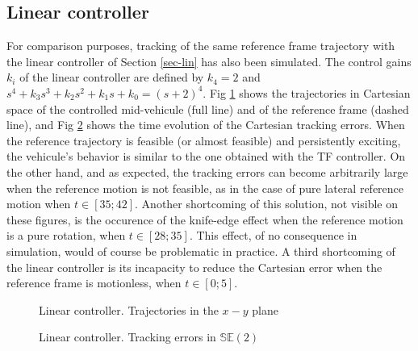 \documentclass[a4paper,twoside]{article}
\def \SE {{\mathbb S}{\mathbb E}}
\begin{document}
\subsection{Linear controller}
For comparison purposes, tracking of the same reference frame trajectory with the linear controller of Section \ref{sec-lin} has also been simulated.
The control gains $k_i$ of the linear controller are defined by $k_4=2$ and $s^4+k_3 s^3 +k_2 s^2 +k_1 s + k_0= (s+2)^4$.
Fig \ref{lin-fig1} shows the trajectories in Cartesian space of the controlled mid-vehicule (full line) and of the reference frame (dashed line), and Fig \ref{lin-fig3} shows the time evolution of the Cartesian tracking errors. When the reference trajectory is feasible (or almost feasible) and persistently 
exciting, the vehicule's behavior is similar to the one obtained with the TF controller. On the other hand, and as expected, the tracking errors can 
become arbitrarily large when the reference motion is not feasible, as in the case of pure lateral reference 
motion when $t \in [35;42]$. Another shortcoming of this solution, not visible on these figures, is the occurence of 
the knife-edge effect when the reference motion is a pure rotation, when $t \in [28;35]$. This effect, of no consequence 
in simulation, would of course be problematic in practice. A third shortcoming of the linear controller is its incapacity to reduce 
the Cartesian error when the reference frame is motionless, when $t \in[0;5]$.

 

\begin{figure}[htb]
\begin{center}
\end{center}
\caption{Linear controller. Trajectories in the $x-y$ plane}
\label{lin-fig1}
\end{figure}

\begin{figure}[htb]
\begin{center}
\end{center}
\caption{Linear controller. Tracking errors in $\SE(2)$}
\label{lin-fig3}
\end{figure}
\end{document}
